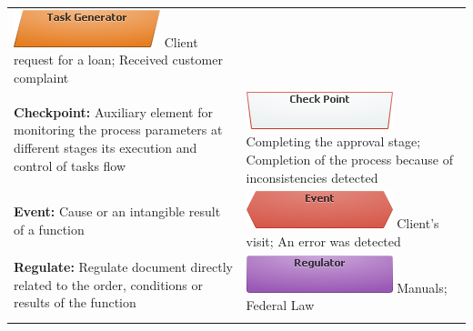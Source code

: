 \documentclass[]{book}
\begin{document}
\begin{longtable}[]{@{}ll@{}}
\begin{minipage}[t]{0.48\columnwidth}
\includegraphics{images/generator.png} \newline Client request for a loan; Received customer complaint\strut
\end{minipage}\tabularnewline
\begin{minipage}[t]{0.46\columnwidth}\raggedright
\textbf{Checkpoint:} Auxiliary element for monitoring the process parameters at different stages its execution and control of tasks flow\strut
\end{minipage} & \begin{minipage}[t]{0.48\columnwidth}\raggedright
\includegraphics{images/checkpoint.png} \newline Completing the approval stage; Completion of the process because of inconsistencies detected\strut
\end{minipage}\tabularnewline
\begin{minipage}[t]{0.46\columnwidth}\raggedright
\textbf{Event:} Cause or an intangible result of a function\strut
\end{minipage} & \begin{minipage}[t]{0.48\columnwidth}\raggedright
\includegraphics{images/event.png} \newline  Client's visit; An error was detected\strut
\end{minipage}\tabularnewline
\begin{minipage}[t]{0.46\columnwidth}\raggedright
\textbf{Regulate:} Regulate document directly related to the order, conditions or results of the function\strut
\end{minipage} & \begin{minipage}[t]{0.48\columnwidth}\raggedright
\includegraphics{images/regulate.png} \newline  Manuals; Federal Law\strut
\end{minipage}\tabularnewline
\begin{minipage}[t]{0.46\columnwidth}\raggedright

\end{minipage}
\end{longtable}
\end{document}
